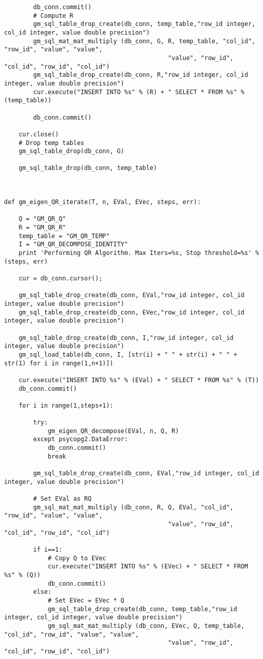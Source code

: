 \documentclass[11pt]{article}
\begin{document}
\begin{lstlisting}
        db_conn.commit()
        # Compute R
        gm_sql_table_drop_create(db_conn, temp_table,"row_id integer, col_id integer, value double precision")
        gm_sql_mat_mat_multiply (db_conn, G, R, temp_table, "col_id", "row_id", "value", "value", 
                                             "value", "row_id", "col_id", "row_id", "col_id")
        gm_sql_table_drop_create(db_conn, R,"row_id integer, col_id integer, value double precision")
        cur.execute("INSERT INTO %s" % (R) + " SELECT * FROM %s" % (temp_table))
        
        db_conn.commit()

    cur.close()
    # Drop temp tables
    gm_sql_table_drop(db_conn, G)
    
    gm_sql_table_drop(db_conn, temp_table)



def gm_eigen_QR_iterate(T, n, EVal, EVec, steps, err):
   
    Q = "GM_QR_Q"
    R = "GM_QR_R"
    temp_table = "GM_QR_TEMP"
    I = "GM_QR_DECOMPOSE_IDENTITY"
    print 'Performing QR Algorithm. Max Iters=%s, Stop threshold=%s' % (steps, err) 
    
    cur = db_conn.cursor();
    
    gm_sql_table_drop_create(db_conn, EVal,"row_id integer, col_id integer, value double precision")
    gm_sql_table_drop_create(db_conn, EVec,"row_id integer, col_id integer, value double precision")
    
    gm_sql_table_drop_create(db_conn, I,"row_id integer, col_id integer, value double precision")
    gm_sql_load_table(db_conn, I, [str(i) + " " + str(i) + " " + str(1) for i in range(1,n+1)]) 
    
    cur.execute("INSERT INTO %s" % (EVal) + " SELECT * FROM %s" % (T))
    db_conn.commit()

    for i in range(1,steps+1):

        try:
            gm_eigen_QR_decompose(EVal, n, Q, R)
        except psycopg2.DataError:
            db_conn.commit()
            break

        gm_sql_table_drop_create(db_conn, EVal,"row_id integer, col_id integer, value double precision")

        # Set EVal as RQ
        gm_sql_mat_mat_multiply (db_conn, R, Q, EVal, "col_id", "row_id", "value", "value", 
                                             "value", "row_id", "col_id", "row_id", "col_id")

        if i==1:
            # Copy Q to EVec
            cur.execute("INSERT INTO %s" % (EVec) + " SELECT * FROM %s" % (Q))
            db_conn.commit()
        else:
            # Set EVec = EVec * Q
            gm_sql_table_drop_create(db_conn, temp_table,"row_id integer, col_id integer, value double precision")
            gm_sql_mat_mat_multiply (db_conn, EVec, Q, temp_table, "col_id", "row_id", "value", "value", 
                                             "value", "row_id", "col_id", "row_id", "col_id")
            

\end{lstlisting}
\end{document}
